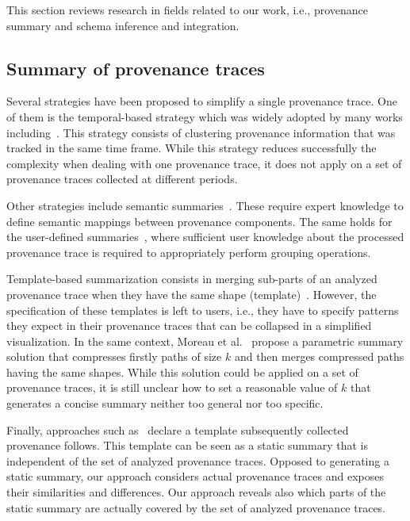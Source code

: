This section reviews research in fields related to our work, i.e., provenance summary and schema inference and integration.
\subsection{Summary of provenance traces}
Several strategies have been proposed to simplify a single provenance trace.
One of them is the temporal-based strategy which was widely adopted by many works including~\cite{Bork13,Stitz:2016}. 
This strategy consists of clustering provenance information that was tracked in the same time frame. While this strategy reduces successfully the complexity when dealing with one provenance trace, it does not apply on a set of provenance traces collected at different periods.

Other strategies include semantic summaries~\cite{Ainy:2015,OliveiraMOOB16,KoopFS13}.
These require expert knowledge to define semantic mappings between provenance components. The same holds for the user-defined summaries~\cite{MissierBGCD14,Biton:2007}, where sufficient user knowledge about the processed provenance trace is required to appropriately perform grouping operations.

Template-based summarization consists in merging sub-parts of an analyzed provenance trace when they have the same shape (template)~\cite{Stitz:2016}. However, the specification of these templates is left to users, i.e., they have to specify patterns they expect in their provenance traces that can be collapsed in a simplified visualization.
In the same context, Moreau et al.~\cite{Moreau15} propose a parametric summary solution that compresses firstly paths of size $k$ and then merges compressed paths having the same shapes. While this solution could be applied on a set of provenance traces, it is still unclear how to set a reasonable value of $k$ that generates a concise summary neither too general nor too specific.




Finally, approaches such as~\cite{Moreau18,Curcin:2017} declare a template subsequently collected provenance follows. This template can be seen as a static summary that is independent of the set of analyzed provenance traces. 
Opposed to generating a static summary, our approach considers actual provenance traces and exposes their similarities and differences. Our approach reveals also which parts of the static summary are actually covered by the set of analyzed provenance traces. 




